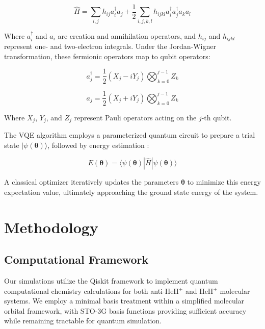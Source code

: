 \documentclass[10pt,twocolumn,a4paper]{article}
\begin{document}
\begin{equation}
\hat{H} = \sum_{i,j} h_{ij} a_i^\dagger a_j + \frac{1}{2}\sum_{i,j,k,l} h_{ijkl} a_i^\dagger a_j^\dagger a_k a_l
\end{equation}

Where $a_i^\dagger$ and $a_i$ are creation and annihilation operators, and $h_{ij}$ and $h_{ijkl}$ represent one- and two-electron integrals. Under the Jordan-Wigner transformation, these fermionic operators map to qubit operators:

\begin{equation}
a_j^\dagger = \frac{1}{2}(X_j - iY_j) \bigotimes_{k=0}^{j-1} Z_k
\end{equation}

\begin{equation}
a_j = \frac{1}{2}(X_j + iY_j) \bigotimes_{k=0}^{j-1} Z_k
\end{equation}

Where $X_j$, $Y_j$, and $Z_j$ represent Pauli operators acting on the $j$-th qubit.

The VQE algorithm employs a parameterized quantum circuit to prepare a trial state $|\psi(\boldsymbol{\theta})\rangle$, followed by energy estimation \cite{tilly2022variational}:

\begin{equation}
E(\boldsymbol{\theta}) = \langle\psi(\boldsymbol{\theta})|\hat{H}|\psi(\boldsymbol{\theta})\rangle
\end{equation}

A classical optimizer iteratively updates the parameters $\boldsymbol{\theta}$ to minimize this energy expectation value, ultimately approaching the ground state energy of the system.

\section{Methodology}

\subsection{Computational Framework}
Our simulations utilize the Qiskit framework \cite{qiskit2019} to implement quantum computational chemistry calculations for both anti-HeH$^+$ and HeH$^+$ molecular systems. We employ a minimal basis treatment within a simplified molecular orbital framework, with STO-3G basis functions providing sufficient accuracy while remaining tractable for quantum simulation.
\end{document}
